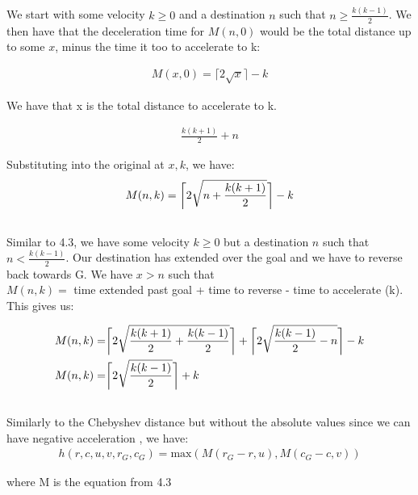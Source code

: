 \documentclass[12pt]{article}
\DeclarePairedDelimiter{\ceil}{\lceil}{\rceil}
\begin{document}
\subsection{}

We start with some velocity $k\geq 0$ and a destination $n$ such that $n \geq \frac{k(k-1)}{2}$. We then have that the deceleration time for $M(n,0)$ would be the total distance up to some $x$, minus the time it too to accelerate to k:

\begin{align*}
  M(x,0) = \lceil 2\sqrt{x} \rceil - k
\end{align*}

We have that x is the total distance to accelerate to k.

\begin{align*}
  \frac{k(k+1)}{2} + n
\end{align*}

Substituting into the original at $x,k$, we have:
\begin{align*}
  M(n, k) = \ceil[\bigg]{2\sqrt{n + \frac{k(k+1)}{2}}} - k\\
\end{align*}

\subsection{}
Similar to 4.3, we have some velocity $k\geq 0$ but a destination $n$ such that $n < \frac{k(k-1)}{2}$. Our destination has extended over the goal and we have to reverse back towards G. We have $x>n$ such that \\$M(n,k) =$ time extended past goal + time to reverse - time to accelerate (k).\\ This gives us:

\begin{align*}
  M(n, k) = & \ceil[\bigg]{2\sqrt{\frac{k(k+1)}{2} + \frac{k(k-1)}{2}}} + \ceil[\bigg]{2\sqrt{\frac{k(k-1)}{2} - n}} - k\\
  M(n, k) = & \ceil[\bigg]{2\sqrt{\frac{k(k-1)}{2}}} + k
\end{align*}

\subsection{}
Similarly to the Chebyshev distance but without the absolute values since we can have negative acceleration
, we have:
\begin{align*}
  h(r,c,u,v,r_G,c_G) = \mbox{max}(M(r_G - r, u),M(c_G-c, v))
\end{align*}

where M is the equation from 4.3
\end{document}
